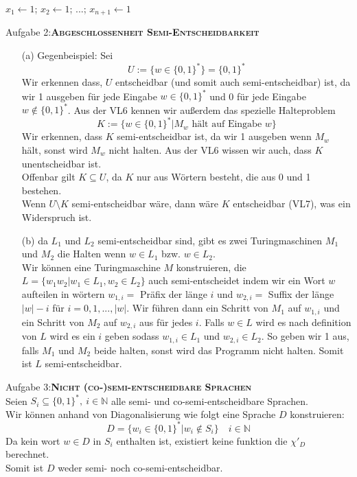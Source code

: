 \documentclass[a4paper,onecolumn,oneside,12pt,ngerman]{article}
\theoremstyle{plain} %
\theoremstyle{definition} %
\theoremstyle{remark} %
\theoremstyle{plain}
\newcommand{\NN}{\mathbb{N}} %
\begin{document}
\begin{algorithm}[H]
    $x_1 \leftarrow 1$; $x_2 \leftarrow 1$; ...; $x_{n+1} \leftarrow 1$\;
\end{algorithm}
\newpage
Aufgabe 2:\quad \textsc{\textbf{Abgeschlossenheit Semi-Entscheidbarkeit}}
\vspace{20pt}
\begin{enumerate}
    \item[(a)] Gegenbeispiel: Sei 
    \[U := \{w\in\{0,1\}^\ast\} = \{0,1\}^\ast\] 
    Wir erkennen dass, $U$ entscheidbar (und somit auch semi-entscheidbar)
    ist, da wir 1 ausgeben für jede Eingabe $w\in\{0,1\}^\ast$ und 0 für jede Eingabe $w\notin\{0,1\}^\ast$.
    Aus der VL6 kennen wir außerdem das spezielle Halteproblem 
    \[K := \{w \in \{0,1\}^\ast | M_w \text{ hält auf Eingabe }w\}\]
    Wir erkennen, dass $K$ semi-entscheidbar ist, da wir 1 ausgeben wenn $M_w$ hält, sonst wird $M_w$ nicht halten.
    Aus der VL6 wissen wir auch, dass $K$ unentscheidbar ist.\\
    Offenbar gilt $K \subseteq U$, da $K$ nur aus Wörtern besteht, die aus 0 und 1 bestehen.\\
    Wenn $U\setminus K$ semi-entscheidbar wäre, dann wäre $K$ entscheidbar (VL7), was ein Widerspruch ist.
    \item[(b)] da $L_1$ und $L_2$ semi-entscheidbar sind, gibt es zwei Turingmaschinen $M_1$ und $M_2$
    die Halten wenn $w\in L_1$ bzw. $w\in L_2$.\\
    Wir können eine Turingmaschine $M$ konstruieren, die $L = \{w_1w_2 | w_1 \in L_1, w_2 \in L_2\}$ auch semi-entscheidet indem wir
    ein Wort $w$ aufteilen in wörtern $w_{1,i} =$ Präfix der länge $i$ und $w_{2,i}=$ Suffix der länge $|w|-i$ für $i=0,1,...,|w|$.
    Wir führen dann ein Schritt von $M_1$ auf $w_{1,i}$ und ein Schritt von $M_2$ auf $w_{2,i}$ aus für jedes $i$.
    Falls $w\in L$ wird es nach definition von $L$ wird es ein $i$ geben sodass $w_{1,i} \in L_1$ und $w_{2,i} \in L_2$. 
    So geben wir 1 aus, falls $M_1$ und $M_2$ beide halten, sonst wird das Programm nicht halten. Somit ist $L$ semi-entscheidbar.
\end{enumerate}
\newpage
Aufgabe 3:\quad \textsc{\textbf{Nicht (co-)semi-entscheidbare Sprachen}}
\vspace{20pt}\\
Seien $S_i \subseteq \{0,1\}^\ast, \ i\in\NN$ alle semi- und co-semi-entscheidbare Sprachen.\\
Wir können anhand von Diagonalisierung wie folgt eine Sprache $D$ konstruieren:
\[D = \{w_i \in \{0,1\}^\ast| w_i \not\in S_i\}\quad i\in\NN\]
Da kein wort $w \in D$ in $S_i$ enthalten ist, existiert keine funktion die $\chi'_D$ berechnet.\\
Somit ist $D$ weder semi- noch co-semi-entscheidbar.
\end{document}
